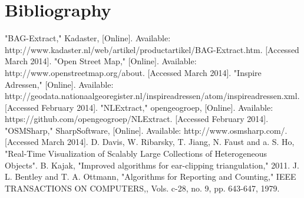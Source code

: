 \chapter{Bibliography}
\label{chap:Bibliography}
\begingroup
\renewcommand{\chapter}[2]{}%
\begin{thebibliography}{}
"BAG-Extract," Kadaster, [Online]. Available: http://www.kadaster.nl/web/artikel/productartikel/BAG-Extract.htm. [Accessed March 2014].
"Open Street Map," [Online]. Available: http://www.openstreetmap.org/about. [Accessed March 2014].
"Inspire Adressen," [Online]. Available: http://geodata.nationaalgeoregister.nl/inspireadressen/atom/inspireadressen.xml. [Accessed February 2014].
"NLExtract," opengeogroep, [Online]. Available: https://github.com/opengeogroep/NLExtract. [Accessed February 2014].
"OSMSharp," SharpSoftware, [Online]. Available: http://www.osmsharp.com/. [Accessed March 2014].
D. Davis, W. Ribarsky, T. Jiang, N. Faust and a. S. Ho, "Real-Time Visualization of Scalably Large Collections of Heterogeneous Objects".
B. Kajak, "Improved algorithms for ear-clipping triangulation," 2011.
J. L. Bentley and T. A. Ottmann, "Algorithms for Reporting and Counting," IEEE TRANSACTIONS ON COMPUTERS,, Vols. c-28, no. 9, pp. 643-647, 1979.
\end{thebibliography}
\endgroup
